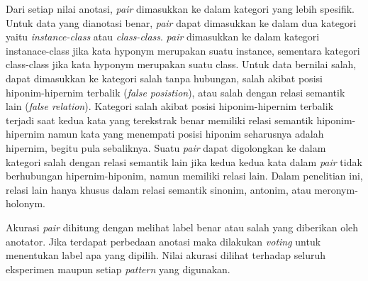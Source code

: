Dari setiap nilai anotasi, \textit{pair} dimasukkan ke dalam kategori yang lebih spesifik. Untuk data yang dianotasi benar, \textit{pair} dapat dimasukkan ke dalam dua kategori yaitu \textit{instance-class} atau \textit{class-class}. \textit{pair} dimasukkan ke dalam kategori instanace-class jika kata hyponym merupakan suatu instance, sementara kategori class-class jika kata hyponym merupakan suatu class. Untuk data bernilai salah, dapat dimasukkan ke kategori salah tanpa hubungan, salah akibat posisi hiponim-hipernim terbalik (\textit{false posistion}), atau salah dengan relasi semantik lain (\textit{false relation}). Kategori salah akibat posisi hiponim-hipernim terbalik terjadi saat kedua kata yang terekstrak benar memiliki relasi semantik hiponim-hipernim namun kata yang menempati posisi hiponim seharusnya adalah hipernim, begitu pula sebaliknya. Suatu \textit{pair} dapat digolongkan ke dalam kategori salah dengan relasi semantik lain jika kedua kedua kata dalam \textit{pair} tidak berhubungan hipernim-hiponim, namun memiliki relasi lain. Dalam penelitian ini, relasi lain hanya khusus dalam relasi semantik sinonim, antonim, atau meronym-holonym.

Akurasi \textit{pair} dihitung dengan melihat label benar atau salah yang diberikan oleh anotator. Jika terdapat perbedaan anotasi maka dilakukan \textit{voting} untuk menentukan label apa yang dipilih. Nilai akurasi dilihat terhadap seluruh eksperimen maupun setiap \textit{pattern} yang digunakan.

